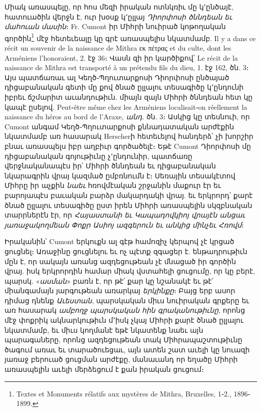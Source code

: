 \documentclass{article}
\begin{document}
{Միակ առասպելը, որ հոս մեզի իրական ոտնկռիւ մը կ՚ընծայէ, հատուածին վերջն է, ուր խօսք կ՚ըլլայ \emph{Դիորփոսի ծննդեան եւ մահուան մասին}։ Fr. Cumont իր Միհրի նուիրած կոթողական գործին\footnote{Textes et Monuments rélatifs aux mystères de Mithra, Bruxelles, 1֊2., 1896֊1899.} մէջ հետեւեալը կը գրէ առասպելիս նկատմամբ. Il y a dans ce récit un souvenir de la naissance de Mithra εκ πέτρας et du culte, dont les Arméniens l'honoraient, 2. էջ 36։ Վասն զի իր կարծիքով՝ Le récit de la naissance de Mithra est transporté à un prétendu fils du dieu, 1. էջ 162, ծն. 3։ Այս պատճառաւ ալ Կեղծ֊Պղուտարքոսի Դիորփոսի ընծայած դիցաբանական գետի մը քով ծնած ըլլալու տեսագիծը կ՚ընդունի իբրեւ ճշմարիտ աւանդութիւն. միայն զայն Միհրի ծննդեան հետ կը կապէ ըսելով. Peut֊être même chez les Arméniens localisait֊on réellement la naissance du héros au bord de l'Araxe, \emph{անդ.} ծն. 3։ Ասկից կը տեսնուի, որ Cumont անգամ Կեղծ֊Պղուտարքոսի քննադատական արժէքին նկատմամբ առ հասարակ Herscherի հետեւելով հանդերձ՝ չի խորշիր բնաւ առասպելս իբր աղբիւր գործածելէ։ Եթէ Cumont Դիորփոսի մը դիցաբանական գոյութիւնը չ՚ընդունիր, պատճառը վերջնականապէս իր՝ Միհրի ծննդեան եւ դիցաբանական նկարագրին վրայ կազմած ըմբռնումն է։ Սեռային տեսակէտով Միհրը իր աչքին \emph{նաեւ} հռովմէական շրջանին մաքուր էր եւ բարոյապէս բաւական բարձր մակարդակի վրայ. եւ երկրորդ՝ քարէ ծնած ըլլալու տեսագիծը ըստ իրեն Միհրի առասպելին սկզբնական տարրներէն էր, որ \emph{Հայաստանի եւ Կապադովկիոյ վրայէն անցաւ յառաջակողմեան Փոքր Ասիոյ ազգերուն եւ անկից մինչեւ Հռովմ}։

Իրականին՝ Cumont երկուքն ալ գէթ համոզիչ կերպով չէ կրցած ցուցնել։ Առաջինը ցուցնելու եւ ոչ պէտք զգացեր է. ենթադրութիւն մըն է, որ սակայն առանց ազդեցութեան չէ մնացած իր գործին վրայ. իսկ երկրորդին համար միակ վստահելի ցուցումը, որ կը բերէ, պարսկ. «\emph{ասման}» բառն է, որ թէ՛ քար կը նշանակէ եւ թէ՛ միանգամայն յարգութեան առարկայ \emph{երկինքը}։ Բայց երբ ասոր դիմաց դնենք \emph{Աւեստան}, պարսկական միւս նուիրական գրքերը եւ առ հասարակ \emph{ամբողջ պարսկական հին գրականութիւնը}, որոնց մէջ փոքրիկ ակնարկութիւն մ՚իսկ չկայ Միհրի քարէ ծնած ըլլալու նկատմամբ, եւ միւս կողմանէ եթէ նկատենք նաեւ այն պարագաները, որոնց ազդեցութեան տակ Միհրապաշտութիւնը ծագում առաւ եւ տարածուեցաւ, այն ատեն շատ աւելի կը նուազի յառաջ բերուած ցուցման արժէքը, մանաւանդ որ եղածը Միհրի առասպելին աւելի մերձեցում է քան իրական ցուցում։

}
\end{document}

